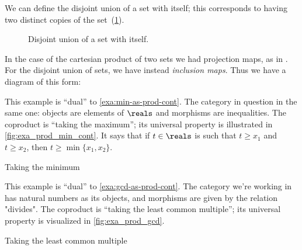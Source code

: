 We can define the disjoint union of a set with itself; this corresponds to having two distinct copies of the set~(\cref{fig:disjointself}).

\begin{figure}[h!]
    \centering
    \caption{Disjoint union of a set with itself.}
    \label{fig:disjointself}
\end{figure}

In the case of the cartesian product of two sets we had projection maps, as in \XXX. For the disjoint union of sets, we have instead \emph{inclusion maps}. Thus we have a diagram of this form:


\begin{figure}[h!]
    \centering
    \caption{}
    \label{fig:coprod_disunion_diagram}
\end{figure}


\begin{example}
    \label{exa:min-as-prod-cont-to-rename}
    This example is ``dual'' to \cref{exa:min-as-prod-cont}. The category in question in the same one: objects are elements of $\reals$ and morphisms are inequalities.
    The coproduct is ``taking the maximum''; its universal property is illustrated in \cref{fig:exa_prod_min_cont}. It says that if $t \in \reals$ is such that $t \geq x_1$ and $t \geq x_2$, then $t \geq \min \{ x_1, x_2 \}$.
    \begin{marginfigure}
        \centering
        \caption{Taking the minimum}
        \label{fig:exa_coprod_max_cont}
    \end{marginfigure}
\end{example}

\begin{example}
    \label{exa:lcm-as-coprod-cont}
    This example is ``dual'' to \cref{exa:gcd-as-prod-cont}. The category we're working in has natural numbers as its objects, and morphisms are given by the relation "divides".
    The coproduct is ``taking the least common multiple''; its universal property is visualized in \cref{fig:exa_prod_gcd}.
    \begin{marginfigure}
        \centering
        \caption{Taking the least common multiple}
        \label{fig:exa_coprod_lcm_cont}
    \end{marginfigure}
\end{example}

